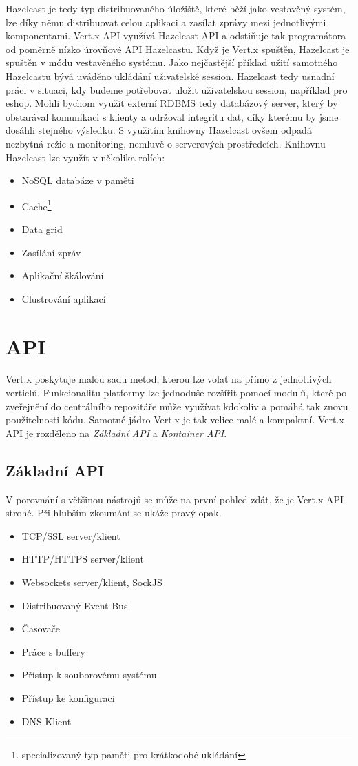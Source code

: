 Hazelcast je tedy typ distribuovaného úložiště, které běží jako vestavěný systém, lze díky němu distribuovat celou aplikaci a zasílat zprávy mezi jednotlivými komponentami. Vert.x API využívá Hazelcast API a odstiňuje tak programátora od poměrně nízko úrovňové API Hazelcastu. Když je Vert.x spuštěn, Hazelcast je spuštěn v módu vestavěného systému. Jako nejčastější příklad užití samotného Hazelcastu bývá uváděno ukládání uživatelské session\cite{session}. Hazelcast tedy usnadní práci v situaci, kdy budeme potřebovat uložit uživatelskou session, například pro eshop. Mohli bychom využít externí RDBMS tedy databázový server, který by obstarával komunikaci s klienty a udržoval integritu dat, díky kterému by jsme dosáhli stejného výsledku. S využitím knihovny Hazelcast ovšem odpadá nezbytná režie a monitoring, nemluvě o serverových prostředcích.
Knihovnu Hazelcast lze využít v několika rolích:
\begin{itemize}
\item{NoSQL databáze v paměti}
\item{Cache\footnote{specializovaný typ paměti pro krátkodobé ukládání}}
\item{Data grid}
\item{Zasílání zpráv}
\item{Aplikační škálování}
\item{Clustrování aplikací}
\end{itemize}

\section{API}\label{sub:API}

Vert.x poskytuje malou sadu metod, kterou lze volat na přímo z jednotlivých verticlů.
Funkcionalitu platformy lze jednoduše rozšířit pomocí modulů, které po zveřejnění do centrálního repozitáře může využívat kdokoliv a pomáhá tak znovu použitelnosti kódu. Samotné jádro Vert.x je tak velice malé a kompaktní. Vert.x API je rozděleno na \emph{Základní API} a \emph{Kontainer API}.

\subsection{Základní API}\label{sub:coreAPI}

V porovnání s většinou nástrojů se může na první pohled zdát, že je Vert.x API strohé. Při hlubším zkoumání se ukáže pravý opak.

\begin{itemize}
\item{TCP/SSL server/klient}
\item{HTTP/HTTPS server/klient}
\item{Websockets server/klient, SockJS}
\item{Distribuovaný Event Bus}
\item{Časovače}
\item{Práce s buffery}
\item{Přístup k souborovému systému}
\item{Přístup ke konfiguraci}
\item{DNS Klient}
\end{itemize}

